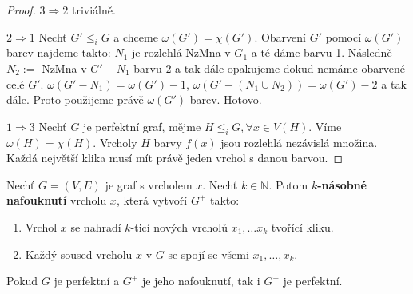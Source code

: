 \begin{proof}
	$3 \Rightarrow 2$ triviálně.
	
	$2 \Rightarrow 1$ Nechť $G' \leq_{i} G$ a chceme $\omega(G') = \chi(G')$. Obarvení $G'$ pomocí $\omega(G')$ barev najdeme takto: $N_{1}$ je rozlehlá NzMna v $G_{1}$ a té dáme barvu 1. Následně $N_{2} :=$ NzMna v $G' - N_{1}$ barvu 2 a tak dále opakujeme dokud nemáme obarvené celé $G'$. $\omega(G' - N_{1}) = \omega(G') -1$, $\omega(G' - (N_{1} \cup N_{2})) = \omega(G') -2$ a tak dále. Proto použijeme právě $\omega(G')$ barev. Hotovo.
	
	$1 \Rightarrow 3$ Nechť $G$ je perfektní graf, mějme $H \leq_{i} G, \forall x \in V(H)$. Víme $\omega(H) = \chi(H)$. Vrcholy $H$ barvy $f(x)$ jsou rozlehlá nezávislá množina. Každá největší klika musí mít právě jeden vrchol s danou barvou.
\end{proof}

\begin{definice}
	Nechť $G= (V,E)$ je graf s vrcholem $x$. Nechť $k \in \mathbb{N}$. Potom \textbf{$k$-násobné nafouknutí} vrcholu $x$, která vytvoří $G^{+}$ takto:
	
	\begin{enumerate}
		\item Vrchol $x$ se nahradí $k$-ticí nových vrcholů $x_{1}, \dots x_{k}$ tvořící kliku.
		\item Každý soused vrcholu $x$ v $G$ se spojí se všemi $x_{1}, \dots, x_{k}$.
	\end{enumerate}
\end{definice}


\begin{lemma}[2]
	Pokud $G$ je perfektní a $G^{+}$ je jeho nafouknutí, tak i $G^{+}$ je perfektní.
\end{lemma}


